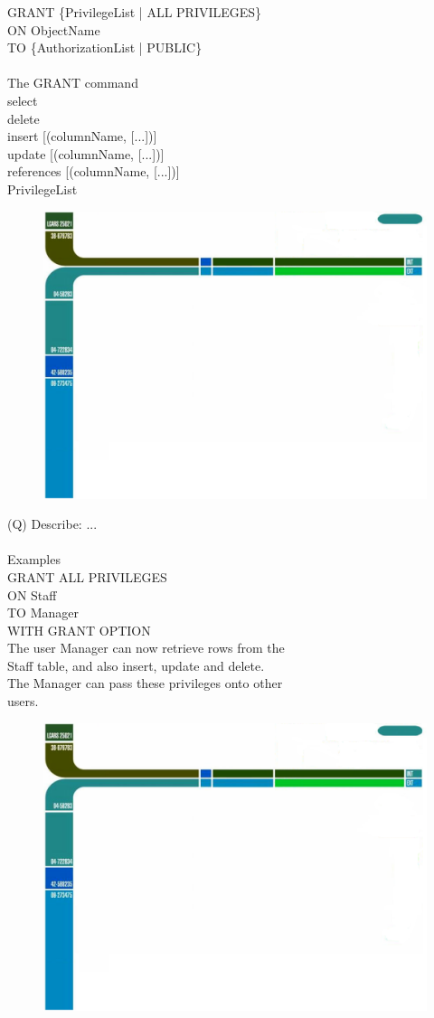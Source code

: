 \documentclass[12pt]{article}
\begin{document}
GRANT \{PrivilegeList | ALL PRIVILEGES\}\\
ON ObjectName\\
TO \{AuthorizationList | PUBLIC\}\\
[WITH GRANT OPTION]\\
The GRANT command\\
select\\
delete\\
insert [(columnName, [...])]\\
update [(columnName, [...])]\\
references [(columnName, [...])]\\
PrivilegeList\\
\begin{figure}[H]
\includegraphics[width=0.5\linewidth]{page21-image-1.png}
\end{figure}
\clearpage
(Q)
Describe: ...
\\ 
 \\
Examples\\
GRANT ALL PRIVILEGES\\
ON Staff\\
TO Manager\\
WITH GRANT OPTION\\
The user Manager can now retrieve rows from the \\
Staff table, and also insert, update and delete.\\
The Manager can pass these privileges onto other \\
users.\\
\begin{figure}[H]
\includegraphics[width=0.5\linewidth]{page22-image-1.png}
\end{figure}
\end{document}
